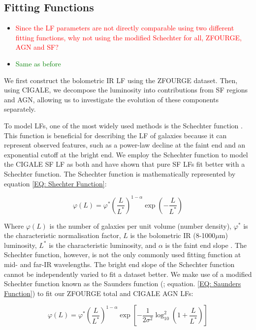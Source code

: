 \subsection{Fitting Functions}
\begin{itemize}
    \item \textcolor{red}{Since the LF parameters are not directly comparable using two different fitting functions, why not using the modified Schechter for all, ZFOURGE, AGN and SF?}
    \item \textcolor{Green}{Same as before}
\end{itemize}

We first construct the bolometric IR LF using the ZFOURGE dataset. Then, using CIGALE, we decompose the luminosity into contributions from SF regions and AGN, allowing us to investigate the evolution of these components separately.

To model LFs, one of the most widely used methods is the Schechter function \citep{schechter_analytic_1976}. This function is beneficial for describing the LF of galaxies because it can represent observed features, such as a power-law decline at the faint end and an exponential cutoff at the bright end. We employ the Schechter function to model the CIGALE SF LF as both \cite{fu_decomposing_2010} and \cite{wu_mid-infrared_2011} have shown that pure SF LFs fit better with a Schechter function. The Schechter function is mathematically represented by equation \ref{EQ: Shechter Function}:

\begin{equation} 
    \varphi(L) = \varphi^* \left(\frac{L}{L^*}\right)^{1-\alpha} \exp\left(-\frac{L}{L^*}\right) 
    \label{EQ: Shechter Function}
\end{equation}

Where $\varphi(L)$ is the number of galaxies per unit volume (number density), $\varphi^*$ is the characteristic normalisation factor, $L$ is the bolometric IR (8-1000$\mu$m) luminosity, $L^*$ is the characteristic luminosity, and $\alpha$ is the faint end slope \citep{schechter_analytic_1976}. The Schechter function, however, is not the only commonly used fitting function at mid- and far-IR wavelengths. The bright end slope of the Schechter function cannot be independently varied to fit a dataset better. We make use of a modified Schechter function known as the Saunders function (\citealp{saunders_60-mum_1990}; equation. \ref{EQ: Saunders Function}) to fit our ZFOURGE total and CIGALE AGN LFs:

\begin{equation} 
    \varphi(L) = \varphi^* \left(\frac{L}{L^*}\right)^{1-\alpha} \exp\left[-\frac{1}{2\sigma^2}\log_{10}^2\left(1+\frac{L}{L^*}\right)\right]
    \label{EQ: Saunders Function}
\end{equation}

